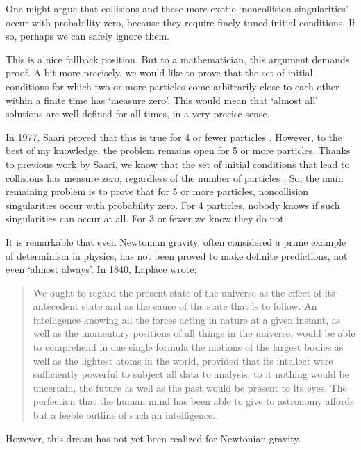 \documentclass{article}
\begin{document}
One might argue that collisions and these more exotic `noncollision singularities' occur with probability zero, because they require finely tuned initial conditions.  If so, perhaps we can safely ignore them.  

This is a nice fallback position.  But to a mathematician, this argument demands proof.   A bit more precisely, we would like to prove that the set of initial conditions for which two or more particles come arbitrarily close to each other within a finite time has `measure zero'.  This would mean that `almost all' solutions are well-defined for all times, in a very precise sense.

In 1977, Saari proved that this is true for 4 or fewer particles \cite{Saari}.  However, to the best of my knowledge, the problem remains open for 5 or more particles.  Thanks to previous work by Saari, we know that the set of initial conditions that lead to collisions has measure zero, regardless of the number of particles \cite{Saari_collision_1,Saari_collision_2}.  So, the main remaining problem is to prove that for 5 or more particles, noncollision singularities occur with probability zero.  For 4 particles, nobody knows if such singularities can occur at all.  For 3 or fewer we know they do not.

It is remarkable that even Newtonian gravity, often considered a prime example of determinism in physics, has not been proved to make definite predictions, not even `almost always'.   In 1840, Laplace \cite{Laplace} wrote:

\begin{quote}
We ought to regard the present state of the universe as the effect of its antecedent state and as the cause of the state that is to follow. An intelligence knowing all the forces acting in nature at a given instant, as well as the momentary positions of all things in the universe, would be able to comprehend in one single formula the motions of the largest bodies as well as the lightest atoms in the world, provided that its intellect were sufficiently powerful to subject all data to analysis; to it nothing would be uncertain, the future as well as the past would be present to its eyes. The perfection that the human mind has been able to give to astronomy affords but a feeble outline of such an intelligence.
\end{quote}

\noindent However, this dream has not yet been realized for Newtonian gravity.  
\end{document}
